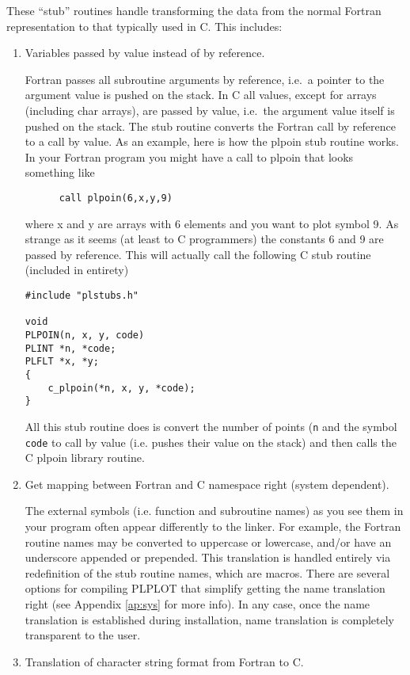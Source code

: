 These ``stub'' routines handle transforming the data
from the normal Fortran representation to that typically used in C.  This
includes:
\begin{enumerate}
\item Variables passed by value instead of by reference.

Fortran passes all subroutine arguments by reference, i.e.~a pointer to the
argument value is pushed on the stack.  In C all values, except for arrays
(including char arrays), are passed by value, i.e.~the argument value
itself is pushed on the stack.  The stub routine converts the Fortran call
by reference to a call by value.  As an example, here is how the plpoin stub
routine works.  In your Fortran program you might have a call to plpoin that
looks something like
\begin{verbatim}
      call plpoin(6,x,y,9)
\end{verbatim}

where x and y are arrays with 6 elements and you want to plot symbol 9.
As strange as it seems (at least to C programmers) the constants 6 and
9 are passed by reference.   This will actually call the following C
stub routine (included in entirety)
\begin{verbatim}
#include "plstubs.h"

void 
PLPOIN(n, x, y, code)
PLINT *n, *code;
PLFLT *x, *y;
{
    c_plpoin(*n, x, y, *code);
}
\end{verbatim}
All this stub routine does is convert the number of points ({\tt *n} and the
symbol {\tt *code} to call by value (i.e.  pushes their value on the stack)
and then calls the C plpoin library routine.

\item Get mapping between Fortran and C namespace right (system dependent).

The external symbols (i.e. function and subroutine names) as you see them
in your program often appear differently to the linker.  For example, the
Fortran routine names may be converted to uppercase or lowercase, and/or
have an underscore appended or prepended.  This translation is handled
entirely via redefinition of the stub routine names, which are macros.
There are several options for compiling PLPLOT that simplify getting the
name translation right (see Appendix \ref{ap:sys} for more info).  In any
case, once the name translation is established during installation, name
translation is completely transparent to the user.

\item Translation of character string format from Fortran to C.


\end{enumerate}
